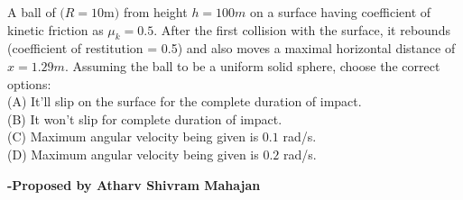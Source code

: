 \documentclass[11pt,a4paper]{scrartcl}
\begin{document}
\begin{problem}

A ball of $(R = 10 $m$)$ from height $h=100 m$ on a surface having coefficient of kinetic friction as $\mu_k = 0.5$. After the first collision with the surface, it rebounds (coefficient of restitution = 0.5) and also moves a maximal horizontal distance of $x=1.29 m$. Assuming the ball to be a uniform solid sphere, choose the correct options: \\
(A) It'll slip on the surface for the complete duration of impact. \\
(B) It won't slip for complete duration of impact. \\
(C) Maximum angular velocity being given is $0.1$ rad/s.\\
(D) Maximum angular velocity being given is $0.2$ rad/s.\\


\end{problem}
\begin{flushright}
\textbf{\Large{-Proposed by Atharv Shivram Mahajan}}
\end{flushright}
\end{document}
